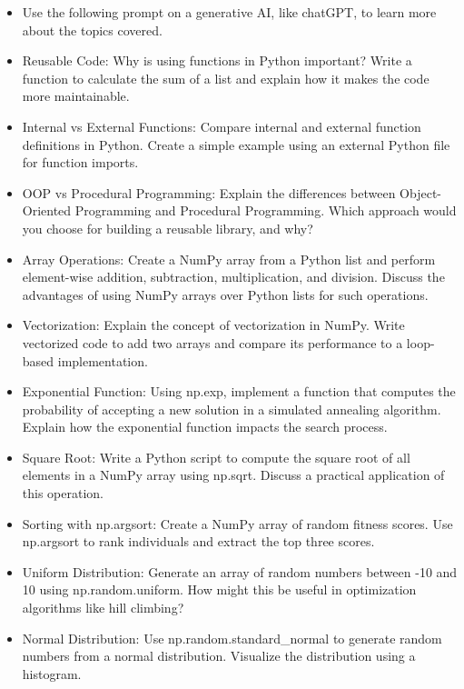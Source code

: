 \documentclass[
  letterpaper,
  DIV=11,
  numbers=noendperiod]{scrreprt}
\providecommand{\tightlist}{%
  \setlength{\itemsep}{0pt}\setlength{\parskip}{0pt}}\usepackage{longtable,booktabs,array}
\begin{document}
\begin{itemize}
\tightlist
\item
  Use the following prompt on a generative AI, like chatGPT, to learn
  more about the topics covered.
\item
  Reusable Code: Why is using functions in Python important? Write a
  function to calculate the sum of a list and explain how it makes the
  code more maintainable.
\item
  Internal vs External Functions: Compare internal and external function
  definitions in Python. Create a simple example using an external
  Python file for function imports.
\item
  OOP vs Procedural Programming: Explain the differences between
  Object-Oriented Programming and Procedural Programming. Which approach
  would you choose for building a reusable library, and why?
\item
  Array Operations: Create a NumPy array from a Python list and perform
  element-wise addition, subtraction, multiplication, and division.
  Discuss the advantages of using NumPy arrays over Python lists for
  such operations.
\item
  Vectorization: Explain the concept of vectorization in NumPy. Write
  vectorized code to add two arrays and compare its performance to a
  loop-based implementation.
\item
  Exponential Function: Using np.exp, implement a function that computes
  the probability of accepting a new solution in a simulated annealing
  algorithm. Explain how the exponential function impacts the search
  process.
\item
  Square Root: Write a Python script to compute the square root of all
  elements in a NumPy array using np.sqrt. Discuss a practical
  application of this operation.
\item
  Sorting with np.argsort: Create a NumPy array of random fitness
  scores. Use np.argsort to rank individuals and extract the top three
  scores.
\item
  Uniform Distribution: Generate an array of random numbers between -10
  and 10 using np.random.uniform. How might this be useful in
  optimization algorithms like hill climbing?
\item
  Normal Distribution: Use np.random.standard\_normal to generate random
  numbers from a normal distribution. Visualize the distribution using a
  histogram.
\end{itemize}

\end{document}
